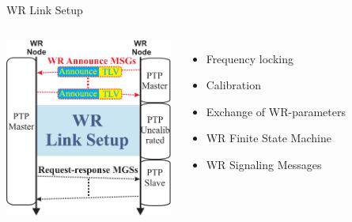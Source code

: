 \documentclass[compress,red]{beamer}
\begin{document}
\begin{frame}{WR Link Setup }

  \begin{columns}[c]

      \begin{center}
      \includegraphics[width=5.5cm]{protocol/wrLinkSetup.pdf}
      \end{center}



      \begin{itemize}
	\item Frequency locking
	\item Calibration
	\item Exchange of WR-parameters
	\item WR Finite State Machine
	\item WR Signaling Messages
      \end{itemize}

  \end{columns}

\end{frame}
\end{document}

